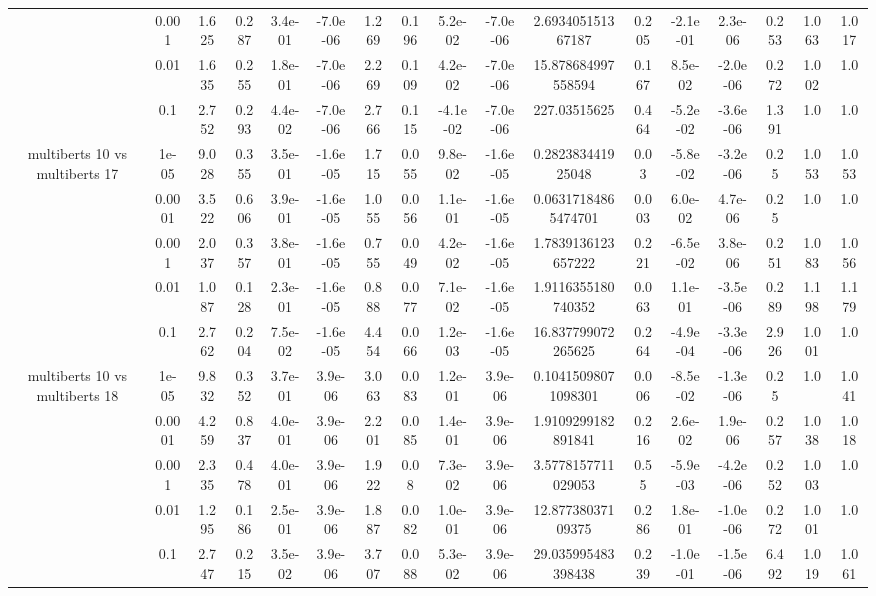 \begin{tabular}{|c|c|c|c|c|c|c|c|c|c|c|c|c|c|c|c|c|}
 & 0.001 & 1.625 & 0.287 & 3.4e-01 & -7.0e-06 & 1.269 & 0.196 & 5.2e-02 & -7.0e-06 & 2.693405151367187 & 0.205 & -2.1e-01 & 2.3e-06 & 0.253 & 1.063 & 1.017 \\
 & 0.01 & 1.635 & 0.255 & 1.8e-01 & -7.0e-06 & 2.269 & 0.109 & 4.2e-02 & -7.0e-06 & 15.878684997558594 & 0.167 & 8.5e-02 & -2.0e-06 & 0.272 & 1.002 & 1.0 \\
 & 0.1 & 2.752 & 0.293 & 4.4e-02 & -7.0e-06 & 2.766 & 0.115 & -4.1e-02 & -7.0e-06 & 227.03515625 & 0.464 & -5.2e-02 & -3.6e-06 & 1.391 & 1.0 & 1.0 \\
\hline
\multirow{5}{*}{multiberts 10 vs multiberts 17} & 1e-05 & 9.028 & 0.355 & 3.5e-01 & -1.6e-05 & 1.715 & 0.055 & 9.8e-02 & -1.6e-05 & 0.282383441925048 & 0.03 & -5.8e-02 & -3.2e-06 & 0.25 & 1.053 & 1.053 \\
 & 0.0001 & 3.522 & 0.606 & 3.9e-01 & -1.6e-05 & 1.055 & 0.056 & 1.1e-01 & -1.6e-05 & 0.06317184865474701 & 0.003 & 6.0e-02 & 4.7e-06 & 0.25 & 1.0 & 1.0 \\
 & 0.001 & 2.037 & 0.357 & 3.8e-01 & -1.6e-05 & 0.755 & 0.049 & 4.2e-02 & -1.6e-05 & 1.7839136123657222 & 0.221 & -6.5e-02 & 3.8e-06 & 0.251 & 1.083 & 1.056 \\
 & 0.01 & 1.087 & 0.128 & 2.3e-01 & -1.6e-05 & 0.888 & 0.077 & 7.1e-02 & -1.6e-05 & 1.9116355180740352 & 0.063 & 1.1e-01 & -3.5e-06 & 0.289 & 1.198 & 1.179 \\
 & 0.1 & 2.762 & 0.204 & 7.5e-02 & -1.6e-05 & 4.454 & 0.066 & 1.2e-03 & -1.6e-05 & 16.837799072265625 & 0.264 & -4.9e-04 & -3.3e-06 & 2.926 & 1.001 & 1.0 \\
\hline
\multirow{5}{*}{multiberts 10 vs multiberts 18} & 1e-05 & 9.832 & 0.352 & 3.7e-01 & 3.9e-06 & 3.063 & 0.083 & 1.2e-01 & 3.9e-06 & 0.10415098071098301 & 0.006 & -8.5e-02 & -1.3e-06 & 0.25 & 1.0 & 1.041 \\
 & 0.0001 & 4.259 & 0.837 & 4.0e-01 & 3.9e-06 & 2.201 & 0.085 & 1.4e-01 & 3.9e-06 & 1.9109299182891841 & 0.216 & 2.6e-02 & 1.9e-06 & 0.257 & 1.038 & 1.018 \\
 & 0.001 & 2.335 & 0.478 & 4.0e-01 & 3.9e-06 & 1.922 & 0.08 & 7.3e-02 & 3.9e-06 & 3.5778157711029053 & 0.55 & -5.9e-03 & -4.2e-06 & 0.252 & 1.003 & 1.0 \\
 & 0.01 & 1.295 & 0.186 & 2.5e-01 & 3.9e-06 & 1.887 & 0.082 & 1.0e-01 & 3.9e-06 & 12.87738037109375 & 0.286 & 1.8e-01 & -1.0e-06 & 0.272 & 1.001 & 1.0 \\
 & 0.1 & 2.747 & 0.215 & 3.5e-02 & 3.9e-06 & 3.707 & 0.088 & 5.3e-02 & 3.9e-06 & 29.035995483398438 & 0.239 & -1.0e-01 & -1.5e-06 & 6.492 & 1.019 & 1.061 \\

\end{tabular}
